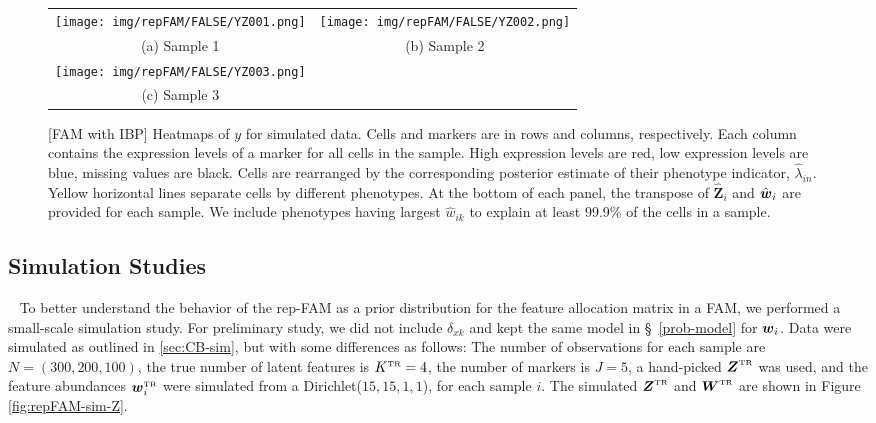 \documentclass[12pt,]{article}
\def\Z{\bm{Z}}
\newcommand{\true}{{\mbox{\tiny TR}}}
\newcommand{\bZ}{\mbox{\boldmath $Z$}}
\newcommand{\bw}{\mbox{\boldmath $w$}}
\newcommand{\bW}{\mbox{\boldmath $W$}}
\begin{document}
\begin{figure}[th!]
  \begin{center}
  \begin{tabular}{cc}
  \texttt{[image: img/repFAM/FALSE/YZ001.png]}&
  \texttt{[image: img/repFAM/FALSE/YZ002.png]}\\
  {\small (a) Sample 1} & {\small(b) Sample 2} \\
  \texttt{[image: img/repFAM/FALSE/YZ003.png]}&\\
  {\small (c) Sample 3} & \\
  \end{tabular}
  \end{center}
  \vspace{-0.05in}
  \caption{\small[FAM with IBP]  Heatmaps of $y$ for
    simulated data.  Cells and markers are in rows and columns, respectively.
    Each column contains the expression levels of a marker for all cells in the
    sample.  High expression levels are red, low expression levels are blue,
    missing values are black.  Cells are rearranged by the corresponding
    posterior estimate of their phenotype indicator, $\hat{\lambda}_{in}$.
    Yellow horizontal lines separate cells by different phenotypes.  At the
    bottom of each panel, the transpose of $\hat{\Z}_i$ and $\hat{\bw}_i$ are
    provided for each sample.  We include phenotypes having largest
    $\hat{w}_{ik}$ to explain at least 99.9\% of the cells in a sample.}
\label{fig:repFAM-FALSE-post-Z}
\end{figure}


\subsection{Simulation Studies}~\label{sec:rep-sim}
To better understand the behavior of the rep-FAM as a prior distribution for
the feature allocation matrix in a FAM, we performed a small-scale simulation
study. For preliminary study, we did not include $\delta_{xk}$ and kept the
same model in \S~\ref{prob-model} for $\bw_i$.   Data were simulated as
outlined in \ref{sec:CB-sim}, but with some differences as follows: The number
of observations for each sample are $N=(300, 200, 100)$, the true number of
latent features is $K^\true=4$, the number of markers is $J=5$, a hand-picked
$\bZ^\true$ was used, and the feature abundances $\bw_i^\true$ were simulated
from a Dirichlet($15, 15, 1, 1$), for each sample $i$.  The simulated
$\bZ^\true$ and $\bW^\true$ are shown in Figure \ref{fig:repFAM-sim-Z}.
\end{document}
